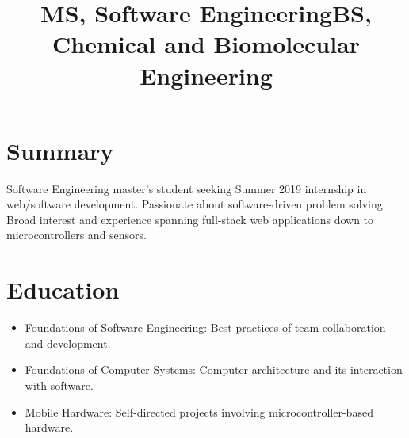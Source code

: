 \documentclass[12pt]{res} %
\begin{document}
    \begin{resume}
 
      \section{Summary}
      Software Engineering master's student seeking Summer 2019 internship in web/software development.
      Passionate about software-driven problem solving.
      Broad interest and experience spanning full-stack web applications down to microcontrollers and sensors.
      \vspace{-12pt}

      \section{Education}

          \title{\textbf{MS, Software Engineering}}
          \begin{position}
              \vspace{-14pt}
              \begin{itemize}[leftmargin=-0.4cm]
              \itemsep0em
              \item Foundations of Software Engineering: Best practices of team collaboration and development.
              \item Foundations of Computer Systems: Computer architecture and its interaction with software.
              \item Mobile Hardware: Self-directed projects involving microcontroller-based hardware.
              \end{itemize}
          \end{position}
          \vspace{-12pt}

          \title{\textbf{BS, Chemical and Biomolecular Engineering}}
          \begin{position}
              \vspace{-14pt}
          \end{position}
          \vspace{-12pt}


\end{resume}
\end{document}
